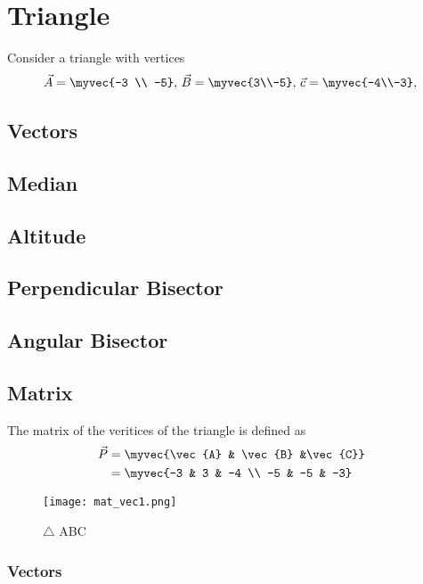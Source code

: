 \documentclass[11pt]{book}
\begin{document}
\frontmatter
\tableofcontents
\setcounter{page}{1}
\mainmatter
\chapter{Triangle}
Consider a triangle with vertices
\begin{align}
\label{eq:tri-pts}
\vec{A}=\myvec{-3 \\ -5},\,
\vec{B}=\myvec{3\\-5},\,
\vec{c}=\myvec{-4\\-3},\,
\end{align}

\section{Vectors}
\section{Median}
\section{Altitude}
\section{Perpendicular Bisector}
\section{Angular Bisector}
\section{Matrix}

The matrix of the veritices of the triangle is defined as
		\begin{align}
			\vec{P} &= \myvec{\vec{A} & \vec{B} &\vec{C}} \\
                                &=\myvec{-3 & 3 & -4 \\ -5 & -5 & -3}
		\end{align}
\begin{figure}[H]
    \centering
    \texttt{[image: mat\_vec1.png]}
    \caption{$\triangle$ ABC}
    \label{fig:mat_vec1}
\end{figure}
\subsection{Vectors}
\end{document}
